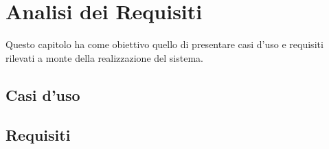 
\chapter{Analisi dei Requisiti}
\label{cap:analisi-requisiti}
Questo capitolo ha come obiettivo quello di presentare casi d'uso e requisiti rilevati a monte della realizzazione del sistema.

\section{Casi d'uso}


\section{Requisiti}